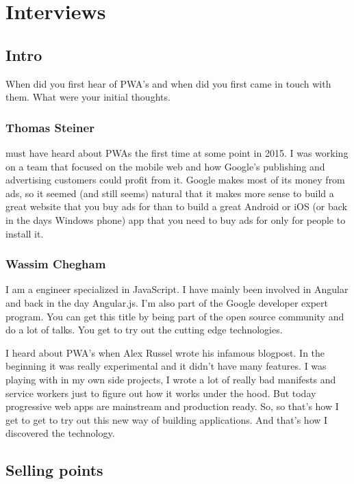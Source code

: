 \chapter{Interviews}
\label{ch:Interview}



	\section{Intro}
	
		When did you first hear of PWA's and when did you first came in touch with them. What were your initial thoughts. 
	
		\subsection{Thomas Steiner}
		
			 must have heard about PWAs the first time at some point in 2015. I was working on a team that focused on the mobile web and how Google’s publishing and advertising customers could profit from it. Google makes most of its money from ads, so it seemed (and still seems) natural that it makes more sense to build a great website that you buy ads for than to build a great Android or iOS (or back in the days Windows phone) app that you need to buy ads for only for people to install it.
		
		\subsection{Wassim Chegham}
		
			I am a engineer specialized in JavaScript. I have mainly been involved in Angular and back in the day Angular.js. I'm also part of the Google developer expert program. You can get this title by being part of the open source community and do a lot of talks. You get to try out the cutting edge technologies. 
		
			I heard about PWA's when Alex Russel wrote his infamous blogpost. In the beginning it was really experimental and it didn't have many features. I was playing with in my own side projects, I wrote a lot of really bad manifests and service workers just to figure out how it works under the hood. But today progressive web apps are mainstream and production ready.  So, so that's how I get to get to try out this new way of building applications. And that's how I discovered the technology.
		
	
	\section{Selling points}
	
